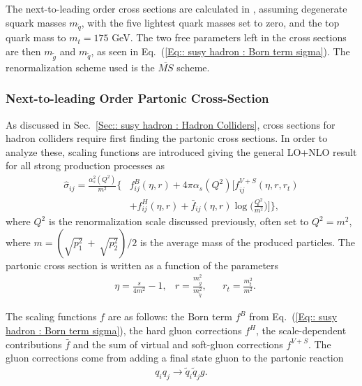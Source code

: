 \documentclass[twoside,english]{uiofysmaster}
\begin{document}
{The next-to-leading order cross sections are calculated in \cite{Beenakker:1996ch}, assuming degenerate squark masses $m_{\widetilde{q}}$, with the five lightest quark masses set to zero, and the top quark mass to $m_t =175$ GeV. The two free parameters left in the cross sections are then $m_{\widetilde{g}}$ and $m_{\widetilde{q}}$, as seen in Eq.~(\ref{Eq:: susy hadron : Born term sigma}). The renormalization scheme used is the $\overline{MS}$ scheme. 



\subsubsection{Next-to-leading Order Partonic Cross-Section}

As discussed in Sec.~\ref{Sec:: susy hadron : Hadron Colliders}, cross sections for hadron colliders require first finding the partonic cross sections. In order to analyze these, scaling functions are introduced \cite{Beenakker:1996ch} giving the general LO+NLO result for all strong production processes as
\begin{align}\label{Eq:: susy hadron : Partonic cross section LO+NLO}
\hat{\sigma}_{ij} = \frac{\alpha_s^2(Q^2)}{m^2} \Big\{ &f^B_{ij}(\eta, r) + 4 \pi \alpha_s (Q^2) \Bigg[ f_{ij}^{V+S}(\eta, r, r_t) \nonumber \\ & + f_{ij}^H (\eta, r) + \bar{f}_{ij} (\eta, r) \log \Bigg( \frac{Q^2}{m^2}\Bigg) \Bigg] \Big\},
\end{align}
where $Q^2$ is the renormalization scale discussed previously, often set to $Q^2 = m^2$, where $m = (\sqrt{p_1^2}~+~\sqrt{p_2^2})/2$ is the average mass of the produced particles. The partonic cross section is written as a function of the parameters
\begin{align}
&\eta = \frac{s}{4m^2} -1, &r= \frac{m_{\widetilde{g}}^2}{m_{\widetilde{q}}^2}, &&r_t = \frac{m_t^2}{m^2}.
\end{align} 

The scaling functions $f$ are as follows: the Born term $f^B$ from Eq.~(\ref{Eq:: susy hadron : Born term sigma}), the hard gluon corrections $f^H$, the scale-dependent contributions $\bar{f}$ and the sum of virtual and soft-gluon corrections $f^{V+S}$. The gluon corrections come from adding a final state gluon to the partonic reaction
\begin{align}
q_i q_j \rightarrow \widetilde{q}_i  \widetilde{q}_j g.
\end{align}

}
\end{document}
